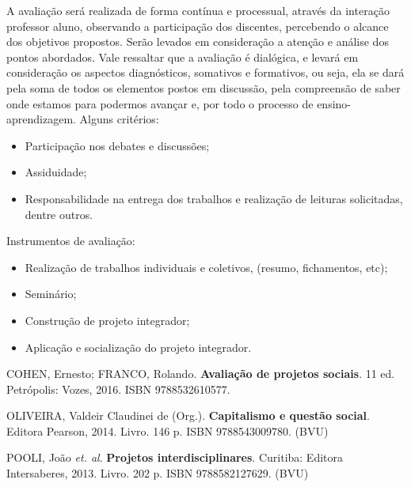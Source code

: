 \begin{pud}
	
	\avaliacao
	A avaliação será realizada de forma contínua e processual, através da interação professor aluno, observando a participação dos discentes, percebendo o alcance dos objetivos propostos. Serão levados em consideração a atenção e análise dos pontos abordados. Vale ressaltar que a avaliação é dialógica, e levará em consideração os aspectos diagnósticos, somativos e formativos, ou seja, ela se dará pela soma de todos os elementos postos em discussão, pela compreensão de saber onde estamos para podermos avançar e, por todo o processo de ensino-aprendizagem. Alguns critérios:
	\begin{itemize}
		\item Participação nos debates e discussões;
        \item Assiduidade; 
        \item Responsabilidade na entrega dos trabalhos e realização de leituras solicitadas, dentre outros. 
	\end{itemize}
	
	Instrumentos de avaliação:
	\begin{itemize}
		\item Realização de trabalhos individuais e coletivos, (resumo, fichamentos, etc);
        \item Seminário; 
        \item Construção de projeto integrador;
        \item Aplicação e socialização do projeto integrador.
    \end{itemize}
    
	
	\begin{bibbasica}
			
        \item COHEN, Ernesto; FRANCO, Rolando. \textbf{Avaliação de projetos sociais}.  11 ed. Petrópolis: Vozes, 2016.  ISBN 9788532610577. 
        \item OLIVEIRA, Valdeir Claudinei de (Org.). \textbf{Capitalismo e questão social}. Editora Pearson, 2014. Livro.  146 p.  ISBN 9788543009780.  (BVU)
        \item POOLI, Jo\~ao \textit{et. al}. \textbf{Projetos interdisciplinares}.  Curitiba: Editora Intersaberes, 2013. Livro.  202 p.  ISBN 9788582127629. (BVU)
 		
	\end{bibbasica}
	

\end{pud}
